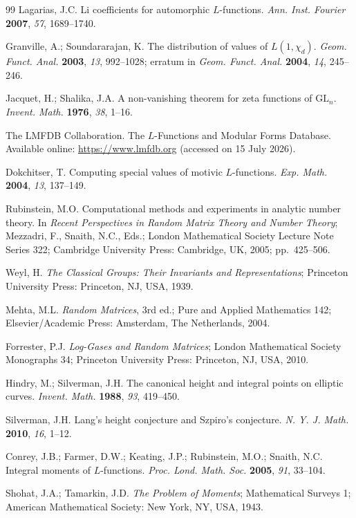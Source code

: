 \documentclass[11pt,reqno]{amsart}
\theoremstyle{remark}
\begin{document}
\begin{thebibliography}{99}
Lagarias, J.C. Li coefficients for automorphic $L$-functions. \emph{Ann. Inst. Fourier} \textbf{2007}, \emph{57}, 1689--1740.

Granville, A.; Soundararajan, K. The distribution of values of $L(1,\chi_d)$. \emph{Geom. Funct. Anal.} \textbf{2003}, \emph{13}, 992--1028; erratum in \emph{Geom. Funct. Anal.} \textbf{2004}, \emph{14}, 245--246.

Jacquet, H.; Shalika, J.A. A non-vanishing theorem for zeta functions of $\mathrm{GL}_n$. \emph{Invent. Math.} \textbf{1976}, \emph{38}, 1--16.

The LMFDB Collaboration. The $L$-Functions and Modular Forms Database. Available online: \url{https://www.lmfdb.org} (accessed on 15 July 2026).

Dokchitser, T. Computing special values of motivic $L$-functions. \emph{Exp. Math.} \textbf{2004}, \emph{13}, 137--149.

Rubinstein, M.O. Computational methods and experiments in analytic number theory. In \emph{Recent Perspectives in Random Matrix Theory and Number Theory}; Mezzadri, F., Snaith, N.C., Eds.; London Mathematical Society Lecture Note Series 322; Cambridge University Press: Cambridge, UK, 2005; pp.~425--506.

Weyl, H. \emph{The Classical Groups: Their Invariants and Representations}; Princeton University Press: Princeton, NJ, USA, 1939.

Mehta, M.L. \emph{Random Matrices}, 3rd ed.; Pure and Applied Mathematics 142; Elsevier/Academic Press: Amsterdam, The Netherlands, 2004.

Forrester, P.J. \emph{Log-Gases and Random Matrices}; London Mathematical Society Monographs 34; Princeton University Press: Princeton, NJ, USA, 2010.

Hindry, M.; Silverman, J.H. The canonical height and integral points on elliptic curves. \emph{Invent. Math.} \textbf{1988}, \emph{93}, 419--450.

Silverman, J.H. Lang's height conjecture and Szpiro's conjecture. \emph{N. Y. J. Math.} \textbf{2010}, \emph{16}, 1--12.

Conrey, J.B.; Farmer, D.W.; Keating, J.P.; Rubinstein, M.O.; Snaith, N.C. Integral moments of $L$-functions. \emph{Proc. Lond. Math. Soc.} \textbf{2005}, \emph{91}, 33--104.

Shohat, J.A.; Tamarkin, J.D. \emph{The Problem of Moments}; Mathematical Surveys 1; American Mathematical Society: New York, NY, USA, 1943.

\end{thebibliography}
\endgroup
\end{document}
